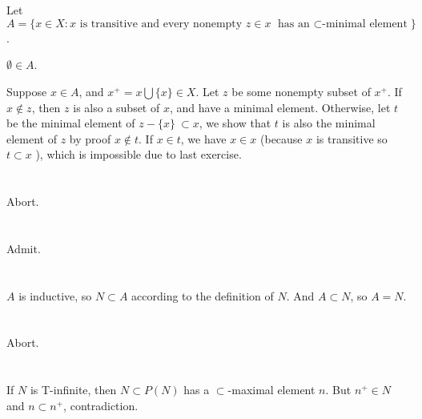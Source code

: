 \section{}
Let $ A = \{ x \in X : x \text{ is transitive and every nonempty } z \in x 
\text{ has an $\subset$-minimal element} \}  $ .

$ \emptyset \in A $.

Suppose $ x \in A $, and $ x^+ = x \bigcup \{x\} \in X $. Let $z$ be some nonempty subset of $x^+$.
If $ x \notin z $, then $z$ is also a subset of $x$, and have a minimal element. Otherwise, 
let $t$ be the minimal element of $ z - \{x\}\ \subset x $, we show that $t$ is also the minimal
element of $z$ by proof $x \notin t$. If $ x \in t $, we have $ x \in x $ (because $x$ is 
transitive so $ t \subset x $ ), which is impossible due to last exercise.


\section{}
Abort.


\section{}
Admit.


\section{}
$A$ is inductive, so $ N \subset A $ according to the definition of $N$. 
And $ A \subset N $, so $ A = N $.


\section{}
Abort.


\section{}
If $N$ is T-infinite, then $ N \subset P(N) $ has a $\subset$-maximal element $n$. 
But $ n^+ \in N $ and $ n \subset n^+ $, contradiction.


\section{}




